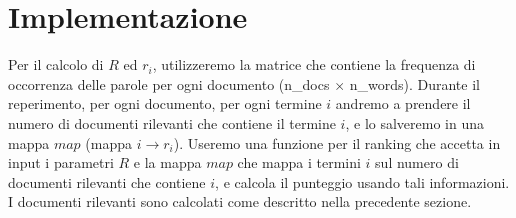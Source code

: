 \documentclass[12pt]{article}
\begin{document}
\section{Implementazione}
Per il calcolo di $R$ ed $r_i$, utilizzeremo la matrice che contiene la frequenza di occorrenza delle parole per ogni documento (n\_docs $\times$ n\_words). Durante il reperimento, per ogni documento, per ogni termine $i$ andremo a prendere il numero di documenti rilevanti che contiene il termine $i$, e lo salveremo in una mappa $map$ (mappa $i \rightarrow r_i$). Useremo una funzione per il ranking che accetta in input i parametri $R$ e la mappa $map$ che mappa i termini $i$ sul numero di documenti rilevanti che contiene $i$, e calcola il punteggio usando tali informazioni.
I documenti rilevanti sono calcolati come descritto nella precedente sezione.
%



\end{document}
